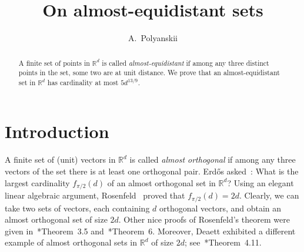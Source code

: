 \documentclass[a4paper, oneside, reqno, 12pt]{amsart}
\title[almost-equidistant sets]{{On almost-equidistant sets}}
\author[A.~Polyanskii]{{A.~Polyanskii}}%
\theoremstyle{plain}
\theoremstyle{definition}
\begin{document}
\thispagestyle{empty}

\begin{abstract}
	A finite set of points in $\mathbb R^d$ is called \textit{almost-equidistant} if among any three distinct points in the set, some two  are at unit distance. We prove that an almost-equidistant set in $\mathbb R^d$ has cardinality at most $5d^{13/9}$.
\end{abstract}

\maketitle
\section{Introduction}

A finite set of (unit) vectors in $\mathbb R^d$ is called \textit{almost orthogonal} if among any three vectors of the set there is at least one orthogonal pair. Erd\H{o}s asked~\cite{R90}: What is the largest cardinality $f_{\pi/2}(d)$ of an almost orthogonal set in $\mathbb R^d$? Using an elegant linear algebraic argument, Rosenfeld~\cite{R90} proved that $f_{\pi/2}(d)=2d$. Clearly, we can take two sets of vectors, each containing $d$ orthogonal vectors, and obtain an almost orthogonal set of size $2d$. Other nice proofs of Rosenfeld's theorem were given in~\cite{D11}*{Theorem~3.5} and~\cite{P02}*{Theorem~6}. Moreover, Deaett exhibited a different example of almost orthogonal sets in $\mathbb R^d$ of size $2d$; see~\cite{D11}*{Theorem~4.11}. 
\end{document}
